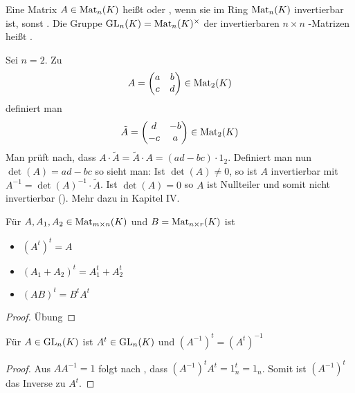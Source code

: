 \begin{definition}[invertierbar]
	Eine Matrix $A\in \operatorname{Mat}_n(K)$ heißt  oder , wenn sie im Ring 
	$\operatorname{Mat}_n(K)$ invertierbar ist, sonst . Die Gruppe $\operatorname{GL}_n(K)=\operatorname{Mat}_n(K)^{\times}$ der invertierbaren $n\times n$
	-Matrizen heißt .
\end{definition}

\begin{example}
	Sei $n=2$. Zu
	\begin{align}
		A=\begin{pmatrix}a & b\\c & d\\\end{pmatrix} \in \operatorname{Mat}_2(K)\notag
	\end{align} 
	definiert man
	\begin{align}
		\tilde A=
		\begin{pmatrix}d & -b\\-c & a\\\end{pmatrix}\in \operatorname{Mat}_2(K)\notag
	\end{align}
	Man prüft nach, dass $A\cdot \tilde A=\tilde A\cdot A=
	(ad-bc)\cdot 1_2$. Definiert man nun $\det(A)=ad-bc$ so sieht man: Ist $\det(A)\neq 0$, so ist $A$ invertierbar mit 
	$A^{-1}=\det(A)^{-1}\cdot \tilde A$. Ist $\det(A)=0$ so $A$ ist Nullteiler und somit nicht invertierbar (). Mehr dazu in Kapitel IV.
\end{example}

\begin{lemma}
	Für $A,A_1,A_2\in \operatorname{Mat}_{m\times n}(K)$ und $B=\operatorname{Mat}_{n\times r}(K)$ ist 
	\begin{itemize}
		\item $(A^t)^t=A$
		\item $(A_1+A_2)^t=A_1^t + A_2^t$
		\item $(AB)^t=B^tA^t$
	\end{itemize}
\end{lemma}
\begin{proof}
	Übung
\end{proof}

\begin{proposition}
	Für $A\in \operatorname{GL}_n(K)$ ist $A^t\in \operatorname{GL}_n(K)$ und $(A^{-1})^t = (A^t)^{-1}$
\end{proposition}
\begin{proof}
	Aus $AA^{-1}=1$ folgt nach , dass $(A^{-1})^tA^t=1_n^t=1_n$. Somit ist $(A^{-1})^t$ das Inverse zu $A^t$.
\end{proof}
